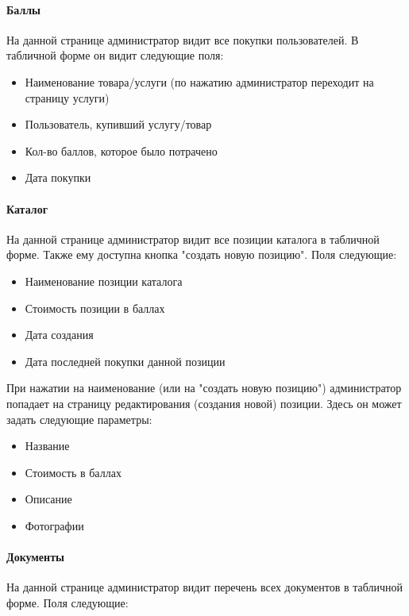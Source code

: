 \documentclass[DIV=calc, paper=a4, fontsize=11pt]{scrartcl} %
\begin{document}
\paragraph{Баллы}

На данной странице администратор видит все покупки пользователей. В табличной форме он видит следующие поля:

\begin{itemize}
	\item Наименование товара/услуги (по нажатию администратор переходит на страницу услуги)
	\item Пользователь, купивший услугу/товар
	\item Кол-во баллов, которое было потрачено
	\item Дата покупки
\end{itemize}

\paragraph{Каталог}

На данной странице администратор видит все позиции каталога в табличной форме. Также ему доступна кнопка "создать новую позицию". Поля следующие:

\begin{itemize}
	\item Наименование позиции каталога
	\item Стоимость позиции в баллах
	\item Дата создания
	\item Дата последней покупки данной позиции
\end{itemize}

При нажатии на наименование (или на "создать новую позицию") администратор попадает на страницу редактирования (создания новой) позиции. Здесь он может задать следующие параметры:

\begin{itemize}
	\item Название
	\item Стоимость в баллах
	\item Описание
	\item Фотографии
\end{itemize}

\paragraph{Документы}

На данной странице администратор видит перечень всех документов в табличной форме. Поля следующие:
\end{document}
